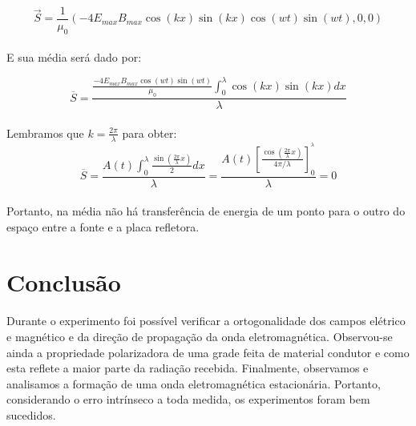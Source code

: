 \documentclass[a4paper,11pt]{article}
\begin{document}
	\begin{equation}
		\vec{S} = \frac{1}{\mu_0} (-4 E_{max}B_{max}\cos (kx) \sin (kx) \cos (wt) \sin (wt), 0, 0)
	\end{equation}
	
	\paragraph{}E sua média será dado por:
	
	\begin{displaymath}
		\overline{S} = \frac{\frac{-4 E_{max}B_{max}\cos (wt) \sin (wt)}{\mu_0} \int _0 ^{\lambda} \cos (kx) \sin (kx) dx}{\lambda}
	\end{displaymath}
	
	\paragraph{}Lembramos que $k = \frac{2 \pi}{\lambda}$ para obter:
	\begin{displaymath}
		\overline{S} = \frac{A(t) \int _0 ^{\lambda} \frac{\sin (\frac{2 \pi}{\lambda}x)}{2} dx}{\lambda} = \frac{A(t)  [\frac{\cos (\frac{2 \pi}{\lambda}x)}{4\pi / \lambda} ]_0^{^{\lambda}}}{\lambda} = 0	
	\end{displaymath}
	
	\paragraph{} Portanto, na média não há transferência de energia de um ponto para o outro do espaço entre a fonte e a placa refletora.
	
	

	
	


	
	
	
	

\section{Conclusão}

\paragraph{} Durante o experimento foi possível verificar a ortogonalidade dos campos elétrico e magnético e da direção de propagação da onda eletromagnética. Observou-se ainda a propriedade polarizadora de uma grade feita de material condutor e como esta reflete a maior parte da radiação recebida. Finalmente, observamos e analisamos a formação de uma onda eletromagnética estacionária. Portanto, considerando o erro intrínseco a toda medida, os experimentos foram bem sucedidos.    
\end{document}
